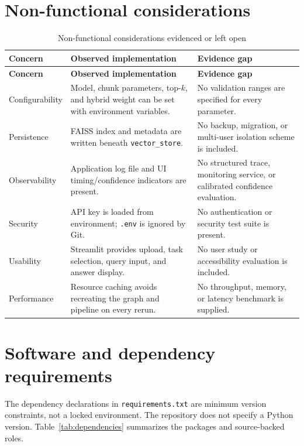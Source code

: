 \section{Non-functional considerations}
\begin{longtable}{p{}p{}p{}}
\caption{Non-functional considerations evidenced or left open}\label{tab:nfr}\\
\toprule
\textbf{Concern} & \textbf{Observed implementation} & \textbf{Evidence gap}\\
\midrule
\endfirsthead
\toprule
\textbf{Concern} & \textbf{Observed implementation} & \textbf{Evidence gap}\\
\midrule
\endhead
Configurability & Model, chunk parameters, top-$k$, and hybrid weight can be set with environment variables. & No validation ranges are specified for every parameter.\\
Persistence & FAISS index and metadata are written beneath \texttt{vector\_store}. & No backup, migration, or multi-user isolation scheme is included.\\
Observability & Application log file and UI timing/confidence indicators are present. & No structured trace, monitoring service, or calibrated confidence evaluation.\\
Security & API key is loaded from environment; \texttt{.env} is ignored by Git. & No authentication or security test suite is present.\\
Usability & Streamlit provides upload, task selection, query input, and answer display. & No user study or accessibility evaluation is included.\\
Performance & Resource caching avoids recreating the graph and pipeline on every rerun. & No throughput, memory, or latency benchmark is supplied.\\
\bottomrule
\end{longtable}

\section{Software and dependency requirements}
The dependency declarations in \texttt{requirements.txt} are minimum version constraints, not a locked environment. The repository does not specify a Python version. Table~\ref{tab:dependencies} summarizes the packages and source-backed roles.


